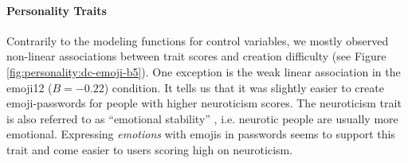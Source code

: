 {{%
	}
	\hspace{0.5cm}
}

\paragraph{Personality Traits}
Contrarily to the modeling functions for control variables, we mostly observed non-linear associations between trait scores and creation difficulty (see Figure \ref{fig:personality:dc-emoji-b5}).
One exception is the weak linear association in the emoji12 ($B=-0.22$) condition. It tells us that it was slightly easier to create emoji-passwords for people with higher neuroticism scores. The neuroticism trait is also referred to as ``emotional stability'' \cite{Costa1992NEO}, i.e. neurotic people are usually more emotional. Expressing \textit{emotions} with emojis in passwords seems to support this trait and come easier to users scoring high on neuroticism. %


